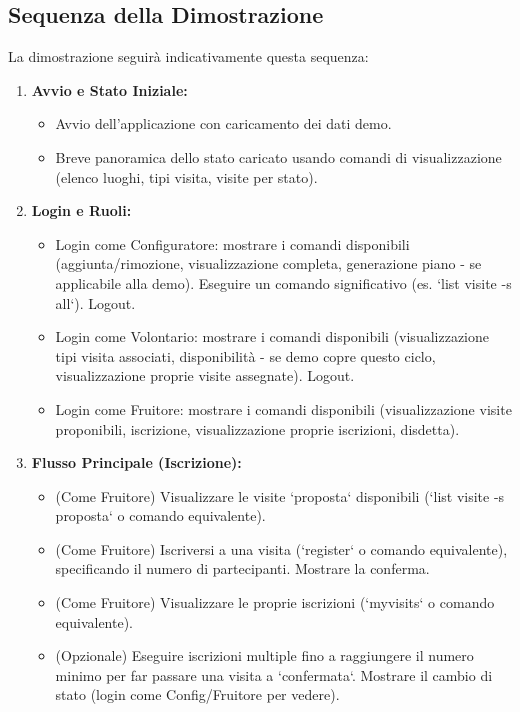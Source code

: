 \documentclass[a4paper,12pt]{article}
\begin{document}
    \subsection{Sequenza della Dimostrazione}
    La dimostrazione seguirà indicativamente questa sequenza:
    \begin{enumerate}
        \item \textbf{Avvio e Stato Iniziale:}
        \begin{itemize}
            \item Avvio dell'applicazione con caricamento dei dati demo.
            \item Breve panoramica dello stato caricato usando comandi di visualizzazione (elenco luoghi, tipi visita, visite per stato).
        \end{itemize}
        \item \textbf{Login e Ruoli:}
        \begin{itemize}
            \item Login come Configuratore: mostrare i comandi disponibili (aggiunta/rimozione, visualizzazione completa, generazione piano - se applicabile alla demo). Eseguire un comando significativo (es. `list visite -s all`). Logout.
            \item Login come Volontario: mostrare i comandi disponibili (visualizzazione tipi visita associati, disponibilità - se demo copre questo ciclo, visualizzazione proprie visite assegnate). Logout.
            \item Login come Fruitore: mostrare i comandi disponibili (visualizzazione visite proponibili, iscrizione, visualizzazione proprie iscrizioni, disdetta).
        \end{itemize}
        \item \textbf{Flusso Principale (Iscrizione):}
        \begin{itemize}
            \item (Come Fruitore) Visualizzare le visite `proposta` disponibili (`list visite -s proposta` o comando equivalente).
            \item (Come Fruitore) Iscriversi a una visita (`register` o comando equivalente), specificando il numero di partecipanti. Mostrare la conferma.
            \item (Come Fruitore) Visualizzare le proprie iscrizioni (`myvisits` o comando equivalente).
            \item (Opzionale) Eseguire iscrizioni multiple fino a raggiungere il numero minimo per far passare una visita a `confermata`. Mostrare il cambio di stato (login come Config/Fruitore per vedere).

\end{itemize}
\end{enumerate}
\end{document}
